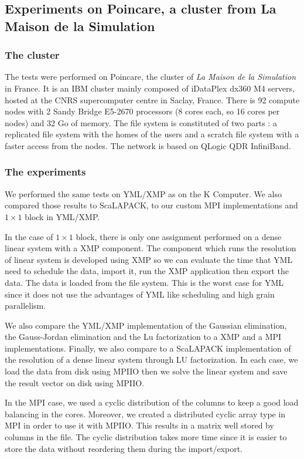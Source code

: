\subsection{Experiments on Poincare, a cluster from La Maison de la Simulation\label{sec:exp}}

\subsubsection{The cluster}
The tests were performed on Poincare, the cluster of \textit{La Maison de la Simulation} in France.
It is an IBM cluster mainly composed of iDataPlex dx360 M4 servers, hosted at the CNRS supercomputer centre in Saclay, France.
There is 92 compute nodes with 2 Sandy Bridge E5-2670 processors (8 cores each, so 16 cores per nodes) and 32 Go of memory.
The file system is constituted of two parts : a replicated file system with the homes of the users and a scratch file system with a faster access from the nodes.
The network is based on QLogic QDR InfiniBand.

\subsubsection{The experiments}
We performed the same tests on YML/XMP as on the K Computer.
We also compared those results to ScaLAPACK, to our custom MPI implementations and $1\times 1$ block in YML/XMP.

In the case of $1\times 1$ block, there is only one assignment performed on a dense linear system with a XMP component.
The component which runs the resolution of linear system is developed using XMP so we can evaluate the time that YML need to schedule the data, import it, run the XMP application then export the data.
The data is loaded from the file system.
This is the worst case for YML since it does not use the advantages of YML like scheduling and high grain parallelism.

We also compare the YML/XMP implementation of the Gaussian elimination, the Gauss-Jordan elimination and the Lu factorization to a XMP and a MPI implementations.
Finally, we also compare to a ScaLAPACK implementation of the resolution of a dense linear system through LU factorization.
In each case, we load the data from disk using MPIIO then we solve the linear system and save the result vector on disk using MPIIO.

In the MPI case, we used a cyclic distribution of the columns to keep a good load balancing in the cores.
Moreover, we created a distributed cyclic array type in MPI in order to use it with MPIIO.
This results in a matrix well stored by columns in the file.
The cyclic distribution takes more time since it is easier to store the data without reordering them during the import/export.

